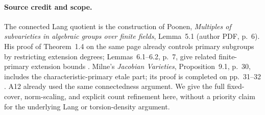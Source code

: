 \paragraph{Source credit and scope.}
The connected Lang quotient is the construction of Poonen,
\emph{Multiples of subvarieties in algebraic groups over finite
fields}, Lemma~5.1 (author PDF, p.~6). His proof of Theorem~1.4 on
the same page already controls primary subgroups by restricting
extension degrees; Lemmas~6.1--6.2, p.~7, give related finite-primary
extension bounds \cite{Poonen2005}. Milne's
\emph{Jacobian Varieties}, Proposition~9.1, p.~30, includes the
characteristic-primary etale part; its proof is completed on
pp.~31--32 \cite{MilneJV}. A12 already used the same connectedness
argument. We give the full fixed-cover, norm-scaling, and explicit
count refinement here, without a priority claim for the underlying
Lang or torsion-density argument.

